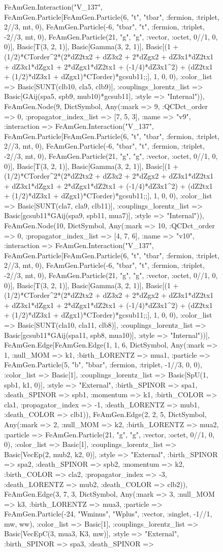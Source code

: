 \documentclass{revtex4}
\begin{document}
\begin{figure}[!htb]
\begin{center}
{FeAmGen.Interaction("V_137", FeAmGen.Particle[FeAmGen.Particle(6, "t", "tbar", :fermion, :triplet, 2//3, mt, 0), FeAmGen.Particle(-6, "tbar", "t", :fermion, :triplet, -2//3, mt, 0), FeAmGen.Particle(21, "g", "g", :vector, :octet, 0//1, 0, 0)], Basic[T(3, 2, 1)], Basic[Gamma(3, 2, 1)], Basic[(1 + (1/2)*CTorder^2*(2*dZ2tx2 + dZ3x2 + 2*dZgx2 + dZ3x1*dZ2tx1 + dZ3x1*dZgx1 + 2*dZgx1*dZ2tx1 + (-1/4)*dZ3x1^2) + (dZ2tx1 + (1/2)*dZ3x1 + dZgx1)*CTorder)*gcsub11;;], 1, 0, 0), :color_list => Basic[SUNT(clb10, cla5, clb9)], :couplings_lorentz_list => Basic[GAij(spa5, spb9, mub10)*gcsub11], :style => "Internal")), FeAmGen.Node(9, Dict{Symbol, Any}(:mark => 9, :QCDct_order => 0, :propagator_index_list => [7, 5, 3], :name => "v9", :interaction => FeAmGen.Interaction("V_137", FeAmGen.Particle[FeAmGen.Particle(6, "t", "tbar", :fermion, :triplet, 2//3, mt, 0), FeAmGen.Particle(-6, "tbar", "t", :fermion, :triplet, -2//3, mt, 0), FeAmGen.Particle(21, "g", "g", :vector, :octet, 0//1, 0, 0)], Basic[T(3, 2, 1)], Basic[Gamma(3, 2, 1)], Basic[(1 + (1/2)*CTorder^2*(2*dZ2tx2 + dZ3x2 + 2*dZgx2 + dZ3x1*dZ2tx1 + dZ3x1*dZgx1 + 2*dZgx1*dZ2tx1 + (-1/4)*dZ3x1^2) + (dZ2tx1 + (1/2)*dZ3x1 + dZgx1)*CTorder)*gcsub11;;], 1, 0, 0), :color_list => Basic[SUNT(cla7, cla9, clb11)], :couplings_lorentz_list => Basic[gcsub11*GAij(spa9, spb11, mua7)], :style => "Internal")), FeAmGen.Node(10, Dict{Symbol, Any}(:mark => 10, :QCDct_order => 0, :propagator_index_list => [4, 7, 6], :name => "v10", :interaction => FeAmGen.Interaction("V_137", FeAmGen.Particle[FeAmGen.Particle(6, "t", "tbar", :fermion, :triplet, 2//3, mt, 0), FeAmGen.Particle(-6, "tbar", "t", :fermion, :triplet, -2//3, mt, 0), FeAmGen.Particle(21, "g", "g", :vector, :octet, 0//1, 0, 0)], Basic[T(3, 2, 1)], Basic[Gamma(3, 2, 1)], Basic[(1 + (1/2)*CTorder^2*(2*dZ2tx2 + dZ3x2 + 2*dZgx2 + dZ3x1*dZ2tx1 + dZ3x1*dZgx1 + 2*dZgx1*dZ2tx1 + (-1/4)*dZ3x1^2) + (dZ2tx1 + (1/2)*dZ3x1 + dZgx1)*CTorder)*gcsub11;;], 1, 0, 0), :color_list => Basic[SUNT(cla10, cla11, clb8)], :couplings_lorentz_list => Basic[gcsub11*GAij(spa11, spb8, mua10)], :style => "Internal"))], FeAmGen.Edge[FeAmGen.Edge(1, 1, 6, Dict{Symbol, Any}(:mark => 1, :null_MOM => k1, :birth_LORENTZ => mua1, :particle => FeAmGen.Particle(5, "b", "bbar", :fermion, :triplet, -1//3, 0, 0), :color_list => Basic[1], :couplings_lorentz_list => Basic[SpU(1, spb1, k1, 0)], :style => "External", :birth_SPINOR => spa1, :death_SPINOR => spb1, :momentum => k1, :birth_COLOR => cla1, :propagator_index => -1, :death_LORENTZ => mub1, :death_COLOR => clb1)), FeAmGen.Edge(2, 2, 5, Dict{Symbol, Any}(:mark => 2, :null_MOM => k2, :birth_LORENTZ => mua2, :particle => FeAmGen.Particle(21, "g", "g", :vector, :octet, 0//1, 0, 0), :color_list => Basic[1], :couplings_lorentz_list => Basic[VecEp(2, mub2, k2, 0)], :style => "External", :birth_SPINOR => spa2, :death_SPINOR => spb2, :momentum => k2, :birth_COLOR => cla2, :propagator_index => -3, :death_LORENTZ => mub2, :death_COLOR => clb2)), FeAmGen.Edge(3, 7, 3, Dict{Symbol, Any}(:mark => 3, :null_MOM => k3, :birth_LORENTZ => mua3, :particle => FeAmGen.Particle(-24, "Wminus", "Wplus", :vector, :singlet, -1//1, mw, ww), :color_list => Basic[1], :couplings_lorentz_list => Basic[VecEpC(3, mua3, K3, mw)], :style => "External", :birth_SPINOR => spa3, :death_SPINOR => }
\end{center}
\end{figure}
\end{document}
